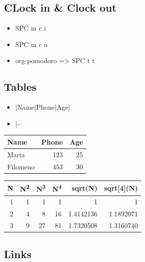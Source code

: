 \documentclass[11pt]{article}
\begin{document}
\subsection{CLock in \& Clock out}
\label{sec:org322e17c}
\begin{itemize}
\item SPC m c i
\item SPC m c o
\item org-pomodoro => SPC t t
\end{itemize}


\subsection{Tables}
\label{sec:org4d9afa2}
\begin{itemize}
\item |Name|Phone|Age|
\item |-
\end{itemize}

\begin{center}
\begin{tabular}{lrr}
Name & Phone & Age\\
\hline
Maria & 123 & 25\\
Filomeno & 453 & 30\\
\end{tabular}
\end{center}



\begin{center}
\begin{tabular}{r|rrr|rr|}
N & N\textsuperscript{2} & N\textsuperscript{3} & N\textsuperscript{4} & sqrt(N) & sqrt[4](N)\\
\hline
1 & 1 & 1 & 1 & 1 & 1\\
2 & 4 & 8 & 16 & 1.4142136 & 1.1892071\\
3 & 9 & 27 & 81 & 1.7320508 & 1.3160740\\
\hline
\end{tabular}
\end{center}


\subsection{Links}
\label{sec:orgb520f49}
\end{document}
